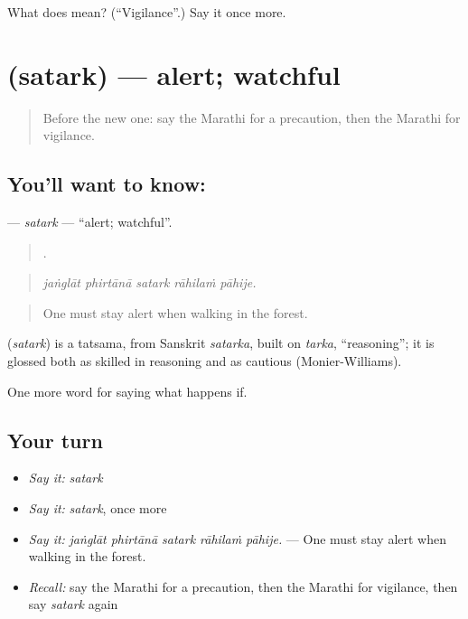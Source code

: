 \begin{tcolorbox}[breakable,colback=teal!4,colframe=teal!35!black,title={Before you move on}]
What does  mean? (\textquotedblleft{}Vigilance\textquotedblright{}.) Say it once more.
\end{tcolorbox}
\section[\texorpdfstring{\mr{सतर्क} (satark)}{सतर्क (satark)}]{ (satark) — alert; watchful}

\label{lesson:MR-C541-satark}



\begin{quote}
Before the new one: say the Marathi for a precaution, then the Marathi for vigilance.
\end{quote}

\subsection*{You'll want to know: }
\textbf{} — \emph{satark} — \textquotedblleft{}alert; watchful\textquotedblright{}.

\begin{quote}
    .
\end{quote}

\begin{quote}
\emph{jaṅglāt phirtānā satark rāhilaṁ pāhije.}
\end{quote}

\begin{quote}
One must stay alert when walking in the forest.
\end{quote}

\begin{cousinweb}
\textbf{} (\emph{satark}) is a tatsama, from Sanskrit \emph{satarka}, built on \emph{tarka}, \textquotedblleft{}reasoning\textquotedblright{}; it is glossed both as skilled in reasoning and as cautious (Monier-Williams).
\end{cousinweb}

\begin{grammarlens}[title={What you've built}]
One more word for saying what happens if.
\end{grammarlens}

\subsection*{Your turn}
\begin{itemize}
\raggedright
  \item \emph{Say it:} \emph{satark}
  \item \emph{Say it:} \emph{satark}, once more
  \item \emph{Say it:} \emph{jaṅglāt phirtānā satark rāhilaṁ pāhije.} — One must stay alert when walking in the forest.
  \item \emph{Recall:} say the Marathi for a precaution, then the Marathi for vigilance, then say \emph{satark} again
\end{itemize}

